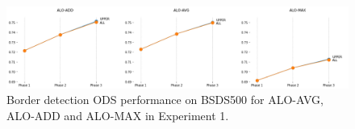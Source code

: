 
\begin{figure}%
  \centering
  \includegraphics[width=1\textwidth]{../imagens/visualiz_dados/bsds_experiment_2-1.png} %
  \caption{Border detection ODS performance on BSDS500 for ALO-AVG, ALO-ADD and ALO-MAX in Experiment 1.}
  \label{fig:bsds_subexp1_results}
\end{figure}

